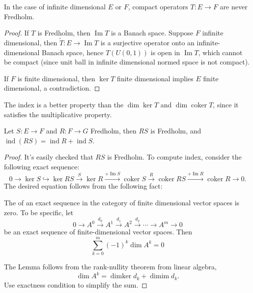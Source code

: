 \begin{nonexample}
	\begin{proposition}
		\label{prop:CompactNotFred}
	In the case of infinite dimensional $E$ or $F$, compact operators $T: E \to F$ are never Fredholm.
	\end{proposition}

	\begin{proof}
		If $T$ is Fredholm, then $\operatorname{Im} T$ is a Banach space. Suppose $F$ infinite dimensional, then $\tilde T: E \to \operatorname{Im} T$ is a surjective operator onto an infinite-dimensional Banach space, hence $T(U(0,1))$ is open in $\operatorname{Im} T$, which cannot be compact (since unit ball in infinite dimensional normed space is not compact).

		If $F$ is finite dimensional, then  $\operatorname{ker} T$ finite dimensional implies $E$ finite dimensional, a contradiction.
	\end{proof}
\end{nonexample}

The index is a better property than the $\operatorname{dim} \operatorname{ker} T$ and $\operatorname{dim} \operatorname{coker} T$, since it satisfies the multiplicative property.

\begin{theorem}
	\label{thm:MultiplicativePropertyIndex}
	Let $S: E \to F$ and $R: F \to G$ Fredholm, then $RS$ is Fredholm, and $\operatorname{ind}(RS) = \operatorname{ind } R + \operatorname{ind } S $.
\end{theorem}
\begin{proof}
	It's easily checked that $RS$ is Fredholm. To compute index, consider the following exact sequence:
	\[
		0 \to \operatorname{ker} S \hookrightarrow \operatorname{ker} RS \xrightarrow{S} \operatorname{ker} R \xrightarrow{+ \operatorname{Im} S} \operatorname{coker} S 
		\xrightarrow{R} \operatorname{coker} RS \xrightarrow{+ \operatorname{Im} R} \operatorname{coker} R \to 0
	.\] 
	The desired equation follows from the following fact:
\begin{lemma}
	\label{lem:EulerCharacteristicZero}
	The  of an exact sequence in the category of finite dimensional vector spaces is zero. To be specific, let
\[
0 \rightarrow A^0 \xrightarrow{d_0} A^1 \xrightarrow{d_1} A^2 \xrightarrow{d_2} \cdots \rightarrow A^m \rightarrow 0
\]
be an exact sequence of finite-dimensional vector spaces. Then
\[
\sum_{k=0}^m(-1)^k \operatorname{dim} A^k=0
\]
\end{lemma}
The Lemma follows from the rank-nullity theorem from linear algebra,
\[
\operatorname{dim} A^k=\operatorname{dimker} d_k+\operatorname{dimim} d_k .
\]
Use exactness condition to simplify the sum.

\end{proof}

